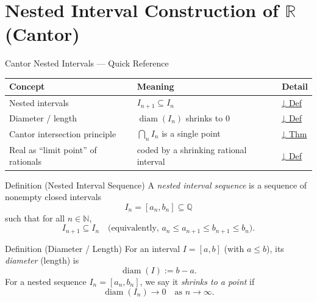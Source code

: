 
\section{Nested Interval Construction of $\mathbb{R}$ (Cantor)}
\label{sec:reals-nested-intervals}

\begin{toolkitbox}{Cantor Nested Intervals — Quick Reference}
\small
\begin{tabular}{l l l}
\toprule
\textbf{Concept} & \textbf{Meaning} & \textbf{Detail} \\
\midrule
Nested intervals & $I_{n+1}\subseteq I_n$ & \hyperref[def:nested-intervals]{↓ Def} \\
Diameter / length & $\operatorname{diam}(I_n)$ shrinks to $0$ & \hyperref[def:diameter]{↓ Def} \\
Cantor intersection principle & $\bigcap_n I_n$ is a single point & \hyperref[thm:cantor-nested]{↓ Thm} \\
Real as ``limit point'' of rationals & coded by a shrinking rational interval & \hyperref[def:real-as-nested]{↓ Def} \\
\bottomrule
\end{tabular}
\end{toolkitbox}



\begin{definitionbox}{Definition (Nested Interval Sequence)}
\label{def:nested-intervals}
A \emph{nested interval sequence} is a sequence of nonempty closed intervals
\[
I_n = [a_n,b_n] \subseteq \mathbb{Q}
\]
such that for all $n\in\mathbb{N}$,
\[
I_{n+1}\subseteq I_n
\quad\text{(equivalently, } a_n \le a_{n+1} \le b_{n+1} \le b_n\text{).}
\]
\end{definitionbox}

\begin{definitionbox}{Definition (Diameter / Length)}
\label{def:diameter}
For an interval $I=[a,b]$ (with $a\le b$), its \emph{diameter} (length) is
\[
\operatorname{diam}(I) := b-a.
\]
For a nested sequence $I_n=[a_n,b_n]$, we say it \emph{shrinks to a point} if
\[
\operatorname{diam}(I_n) \longrightarrow 0 \quad \text{as } n\to\infty.
\]
\end{definitionbox}

